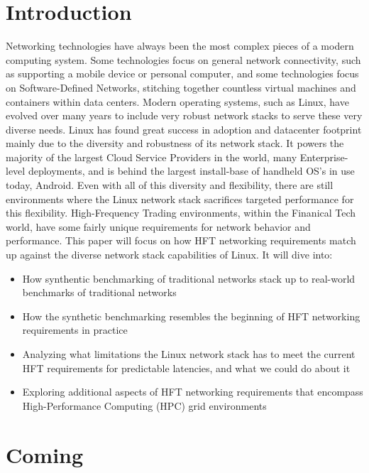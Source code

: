 \documentclass[letterpaper]{article}
\begin{document}
\section{Introduction}
Networking technologies have always been the most complex pieces of a modern computing system. Some technologies focus on general network connectivity, such as supporting a mobile device or personal computer, and some technologies focus on Software-Defined Networks, stitching together countless virtual machines and containers within data centers.
\newline
\newline
Modern operating systems, such as Linux, have evolved over many years to include very robust network stacks to serve these very diverse needs. Linux has found great success in adoption and datacenter footprint mainly due to the diversity and robustness of its network stack. It powers the majority of the largest Cloud Service Providers in the world, many Enterprise-level deployments, and is behind the largest install-base of handheld OS's in use today, Android.
\newline
\newline
Even with all of this diversity and flexibility, there are still environments where the Linux network stack sacrifices targeted performance for this flexibility. High-Frequency Trading environments, within the Finanical Tech world, have some fairly unique requirements for network behavior and performance.
\newline
\newline
This paper will focus on how HFT networking requirements match up against the diverse network stack capabilities of Linux. It will dive into:
\begin{itemize}
\item How synthentic benchmarking of traditional networks stack up to real-world benchmarks of traditional networks
\item How the synthetic benchmarking resembles the beginning of HFT networking requirements in practice
\item Analyzing what limitations the Linux network stack has to meet the current HFT requirements for predictable latencies, and what we could do about it
\item Exploring additional aspects of HFT networking requirements that encompass High-Performance Computing (HPC) grid environments
\end{itemize}

\section{Coming}
\end{document}
